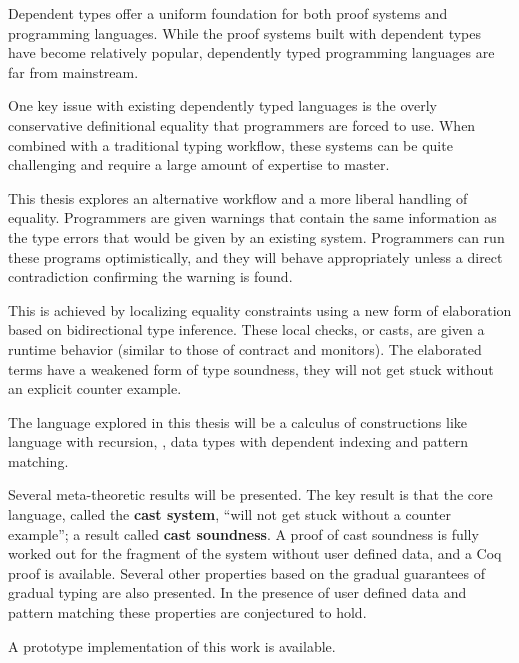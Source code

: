 Dependent types offer a uniform foundation for both proof systems and programming languages.
While the proof systems built with dependent types have become relatively popular, dependently typed programming languages are far from mainstream.

One key issue with existing dependently typed languages is the overly conservative definitional equality that programmers are forced to use.
When combined with a traditional typing workflow, these systems can be quite challenging and require a large amount of expertise to master.

This thesis explores an alternative workflow and a more liberal handling of equality.
Programmers are given warnings that contain the same information as the type errors that would be given by an existing system.
Programmers can run these programs optimistically, and they will behave appropriately unless a direct contradiction confirming the warning is found.

This is achieved by localizing equality constraints using a new form of elaboration based on bidirectional type inference.
These local checks, or casts, are given a runtime behavior (similar to those of contract and monitors).
The elaborated terms have a weakened form of type soundness, they will not get stuck without an explicit counter example.

The language explored in this thesis will be a calculus of constructions like language with recursion, \tit, data types with dependent indexing and pattern matching.

Several meta-theoretic results will be presented.
The key result is that the core language, called the \textbf{cast system}, ``will not get stuck without a counter example''; a result called \textbf{cast soundness}.
A proof of cast soundness is fully worked out for the fragment of the system without user defined data, and a Coq proof is available. Several other properties based on the gradual guarantees of gradual typing are also presented.
In the presence of user defined data and pattern matching these properties are conjectured to hold.

A prototype implementation of this work is available.

